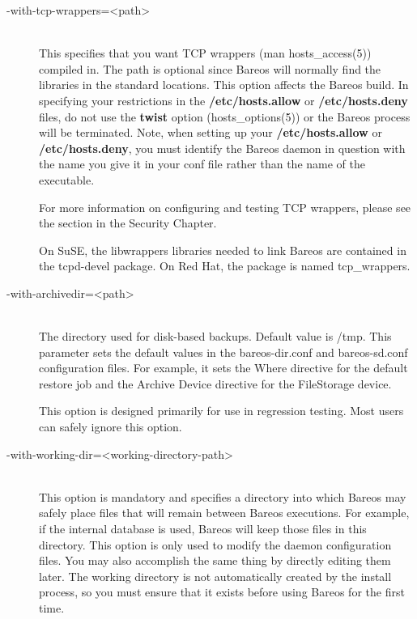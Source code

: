 \begin{description}
\item [ {-}{\-}with-tcp-wrappers={\textless}path{\textgreater}] \hfill \\
This specifies that you  want TCP wrappers (man hosts\_access(5)) compiled in.
The path is optional since  Bareos will normally find the libraries in the
standard locations.  This option affects the Bareos build.  In specifying your
restrictions in the {\bf /etc/hosts.allow}  or {\bf /etc/hosts.deny} files, do
not use the {\bf twist}  option (hosts\_options(5)) or the Bareos process will
be terminated. Note, when setting up your {\bf /etc/hosts.allow}
or {\bf /etc/hosts.deny}, you must identify the Bareos daemon in
question with the name you give it in your conf file rather than the
name of the executable.

For more information on configuring and testing TCP wrappers, please  see the
  section
in the Security Chapter.

On SuSE, the libwrappers libraries needed to link Bareos are
contained in the tcpd-devel package. On Red Hat, the package is named
tcp\_wrappers.

\item [ {-}{\-}with-archivedir={\textless}path{\textgreater}] \hfill \\
The directory used for disk-based backups.  Default value is /tmp.
This parameter sets the default values in the bareos-dir.conf and bareos-sd.conf
configuration files.  For example, it sets the Where directive for the
default restore job and the Archive Device directive for the FileStorage
device.

This option is designed primarily for use in regression testing.
Most users can safely ignore this option.

\item [ {-}{\-}with-working-dir={\textless}working-directory-path{\textgreater}] \hfill \\
This option is mandatory and specifies a directory  into which Bareos may
safely place files that  will remain between Bareos executions. For example,
if the internal database is used, Bareos will keep  those files in this
directory.  This option is only used to modify the daemon  configuration
files. You may also accomplish the same  thing by directly editing them later.
The working directory  is not automatically created by the install process, so
you  must ensure that it exists before using Bareos for the  first time.


\end{description}
